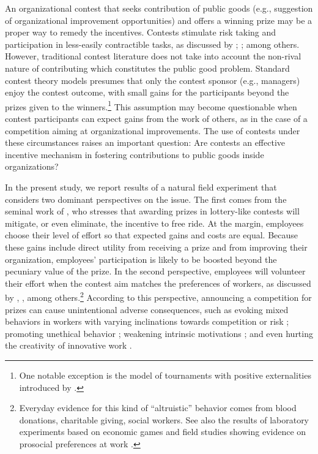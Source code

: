 \documentclass[12pt, titlepage]{article}
\begin{document}
An organizational contest that seeks contribution of public goods (e.g.,
suggestion of organizational improvement opportunities) and offers a
winning prize may be a proper way to remedy the incentives. Contests
stimulate risk taking and participation in less-easily contractible
tasks, as discussed by \citet{lazear1981rank};
\citet{green1983comparison}; \citet{mary1984economic} among others.
However, traditional contest literature does not take into account the
non-rival nature of contributing which constitutes the public good
problem. Standard contest theory models presumes that only the contest
sponsor (e.g., managers) enjoy the contest outcome, with small gains for
the participants beyond the prizes given to the winners.\footnote{One
  notable exception is the model of tournaments with positive
  externalities introduced by \citet{drago1988incentive}.} This
assumption may become questionable when contest participants can expect
gains from the work of others, as in the case of a competition aiming at
organizational improvements. The use of contests under these
circumstances raises an important question: Are contests an effective
incentive mechanism in fostering contributions to public goods inside
organizations?

In the present study, we report results of a natural field experiment
that considers two dominant perspectives on the issue. The first comes
from the seminal work of \citet{morgan2000financing}, who stresses that
awarding prizes in lottery-like contests will mitigate, or even
eliminate, the incentive to free ride. At the margin, employees choose
their level of effort so that expected gains and costs are equal.
Because these gains include direct utility from receiving a prize and
from improving their organization, employees' participation is likely to
be boosted beyond the pecuniary value of the prize. In the second
perspective, employees will volunteer their effort when the contest aim
matches the preferences of workers, as discussed by
\citet{besley2005competition}, \citet{prendergast2007motivation},
\citet{delfgaauw2008incentives} among others.\footnote{Everyday evidence
  for this kind of ``altruistic'' behavior comes from blood donations,
  charitable giving, social workers. See also the results of laboratory
  experiments based on economic games
  \citep[see][]{levitt2007laboratory} and field studies showing evidence
  on prosocial preferences at work
  \citep{bandiera2005social, dellavigna2016estimating}.} According to
this perspective, announcing a competition for prizes can cause
unintentional adverse consequences, such as evoking mixed behaviors in
workers with varying inclinations towards competition or risk
\citep[e.g., men and women][]{niederle2007women, croson2009gender};
promoting unethical behavior \citep{lazear1989pay, charness2013dark};
weakening intrinsic motivations \citep{reeve1996elements, frey1997not};
and even hurting the creativity of innovative work
\citep{erat2015incentives}.
\end{document}
